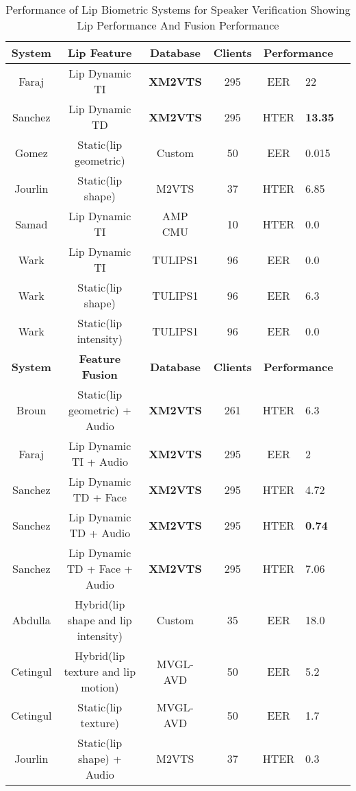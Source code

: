 \begin{table*}[htbp!]
\centering
{}
\begin{tabular}{cccccll}
\toprule
\textbf{System}&\textbf{Lip Feature}&\textbf{Database}&\textbf{Clients}&\multicolumn{2}{c}{\textbf{Performance}} \\
\midrule
Faraj\cite{Faraj06Person}&Lip Dynamic TI&\textbf{XM2VTS}&295&EER&22\\ 
Sanchez\cite{Ramos06Fusion}&Lip Dynamic TD&\textbf{XM2VTS}&295&HTER&\textbf{13.35}\\ 
Gomez\cite{Gomez02Biometric}&Static(lip geometric)&Custom&50&EER&0.015 \\ 
Jourlin\cite{Jourlin97Acoustic}&Static(lip shape)&M2VTS&37&HTER&6.85 \\ 
Samad\cite{Samad07Lower}&Lip Dynamic TI&AMP CMU&10&HTER&0.0 \\ 
Wark\cite{Wark97Person}&Lip Dynamic TI&TULIPS1&96&EER&0.0 \\ 
Wark\cite{Wark97Person}&Static(lip shape)&TULIPS1&96&EER&6.3 \\ 
Wark\cite{Wark97Person}&Static(lip intensity)&TULIPS1&96&EER&0.0 \\ \bottomrule
\textbf{System}&\textbf{Feature Fusion}&\textbf{Database}&\textbf{Clients}&\multicolumn{2}{c}{\textbf{Performance}} \\
\midrule
Broun\cite{Broun02Automatic}&Static(lip geometric) + Audio &\textbf{XM2VTS}&261&HTER&6.3 \\ 
Faraj\cite{Faraj06Person}&Lip Dynamic TI + Audio &\textbf{XM2VTS}&295&EER&2\\ 
Sanchez\cite{Ramos06Fusion}&Lip Dynamic TD + Face&\textbf{XM2VTS}&295&HTER&4.72 \\ 
Sanchez\cite{Ramos06Fusion}&Lip Dynamic TD + Audio&\textbf{XM2VTS}&295&HTER&\textbf{0.74}\\ 
Sanchez\cite{Ramos06Fusion}&Lip Dynamic TD + Face + Audio&\textbf{XM2VTS}&295&HTER&7.06 \\ 
Abdulla\cite{Abdulla09Lips}&Hybrid(lip shape and lip intensity)&Custom&35&EER&18.0 \\ 
Cetingul\cite{Cetingul06Discriminative}&Hybrid(lip texture and lip motion)&MVGL-AVD&50&EER&5.2 \\ 
Cetingul\cite{Cetingul06Multi}&Static(lip texture)&MVGL-AVD&50&EER&1.7 \\ 
Jourlin\cite{Jourlin97Acoustic}&Static(lip shape) + Audio&M2VTS&37&HTER&0.3 \\ 
\bottomrule
\end{tabular}
\caption{Performance of Lip Biometric Systems for Speaker Verification Showing Lip Performance And Fusion Performance}
\label{PerformanceOfLipBiometrics}
\end{table*}
